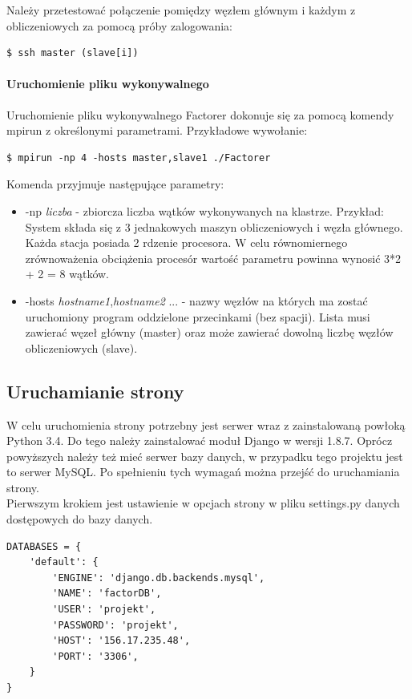 \documentclass{article}
\begin{document}
Należy przetestować połączenie pomiędzy węzłem głównym i każdym z obliczeniowych za pomocą próby zalogowania:
\begin{lstlisting}
$ ssh master (slave[i])
\end{lstlisting}

\paragraph{Uruchomienie pliku wykonywalnego}
Uruchomienie pliku wykonywalnego Factorer dokonuje się za pomocą komendy mpirun z określonymi parametrami. Przykładowe wywołanie:
\begin{lstlisting}
$ mpirun -np 4 -hosts master,slave1 ./Factorer
\end{lstlisting}

Komenda przyjmuje następujące parametry:
\begin{itemize}
\item -np \textit{liczba} - zbiorcza liczba wątków wykonywanych na klastrze. Przykład:
System składa się z 3 jednakowych maszyn obliczeniowych i węzła głównego. Każda stacja posiada 2 rdzenie procesora. W celu równomiernego zrównoważenia obciążenia procesór wartość parametru powinna wynosić 3*2 + 2 = 8 wątków.

\item -hosts \textit{hostname1},\textit{hostname2} ... - nazwy węzłów na których ma zostać uruchomiony program oddzielone przecinkami (bez spacji). Lista musi zawierać węzeł główny (master) oraz może zawierać dowolną liczbę węzłów obliczeniowych (slave).
\end{itemize}

\subsection{Uruchamianie strony}

W celu uruchomienia strony potrzebny jest serwer wraz z zainstalowaną powłoką Python 3.4. Do tego należy zainstalować moduł Django w wersji 1.8.7. Oprócz powyższych należy też mieć serwer bazy danych, w przypadku tego projektu jest to serwer MySQL. Po spełnieniu tych wymagań można przejść do uruchamiania strony.\\

Pierwszym krokiem jest ustawienie w opcjach strony w pliku settings.py danych dostępowych do bazy danych.
\begin{lstlisting}
DATABASES = {
    'default': {
        'ENGINE': 'django.db.backends.mysql',
        'NAME': 'factorDB',
        'USER': 'projekt',
        'PASSWORD': 'projekt',
        'HOST': '156.17.235.48',
        'PORT': '3306',
    }
}
\end{lstlisting}
\end{document}
